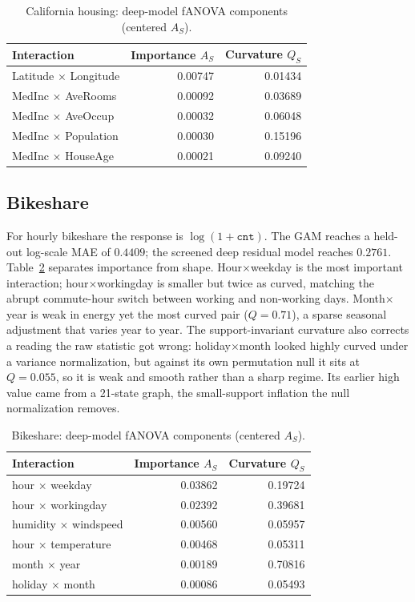 \documentclass[11pt]{article}
\begin{document}
\begin{table}[ht]
\centering
\caption{California housing: deep-model fANOVA components (centered $A_S$).}
\label{tab:housing}
\begin{tabular}{lrr}
\toprule
Interaction & Importance $A_S$ & Curvature $Q_S$\\
\midrule
Latitude $\times$ Longitude & 0.00747 & 0.01434\\
MedInc $\times$ AveRooms    & 0.00092 & 0.03689\\
MedInc $\times$ AveOccup    & 0.00032 & 0.06048\\
MedInc $\times$ Population   & 0.00030 & 0.15196\\
MedInc $\times$ HouseAge    & 0.00021 & 0.09240\\
\bottomrule
\end{tabular}
\end{table}

\subsection{Bikeshare}

For hourly bikeshare the response is $\log(1+\texttt{cnt})$. The GAM reaches a
held-out log-scale MAE of $0.4409$; the screened deep residual model reaches
$0.2761$. Table~\ref{tab:bike} separates importance from shape.
Hour$\times$weekday is the most important interaction; hour$\times$workingday is
smaller but twice as curved, matching the abrupt commute-hour switch between
working and non-working days. Month$\times$year is weak in energy yet the most
curved pair ($Q=0.71$), a sparse seasonal adjustment that varies year to year.
The support-invariant curvature also corrects a reading the raw statistic got
wrong: holiday$\times$month looked highly curved under a variance normalization,
but against its own permutation null it sits at $Q=0.055$, so it is weak and
smooth rather than a sharp regime. Its earlier high value came from a 21-state
graph, the small-support inflation the null normalization removes.

\begin{table}[ht]
\centering
\caption{Bikeshare: deep-model fANOVA components (centered $A_S$).}
\label{tab:bike}
\begin{tabular}{lrr}
\toprule
Interaction & Importance $A_S$ & Curvature $Q_S$\\
\midrule
hour $\times$ weekday    & 0.03862 & 0.19724\\
hour $\times$ workingday & 0.02392 & 0.39681\\
humidity $\times$ windspeed & 0.00560 & 0.05957\\
hour $\times$ temperature & 0.00468 & 0.05311\\
month $\times$ year      & 0.00189 & 0.70816\\
holiday $\times$ month   & 0.00086 & 0.05493\\
\bottomrule
\end{tabular}
\end{table}
\end{document}
